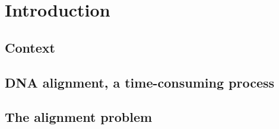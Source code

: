 \documentclass[11pt,twoside]{ce}
\begin{document}

\clearpage
%


\cleardoublepage

\pagestyle{headings}
\pagestyle{private}


%
%
%
%
%
%
%
%
%
%
%
%


\chapter{Introduction}
\label{chap:intro}


\section{Context}


\section{DNA alignment, a time-consuming process}


\section{The alignment problem}

\end{document}
